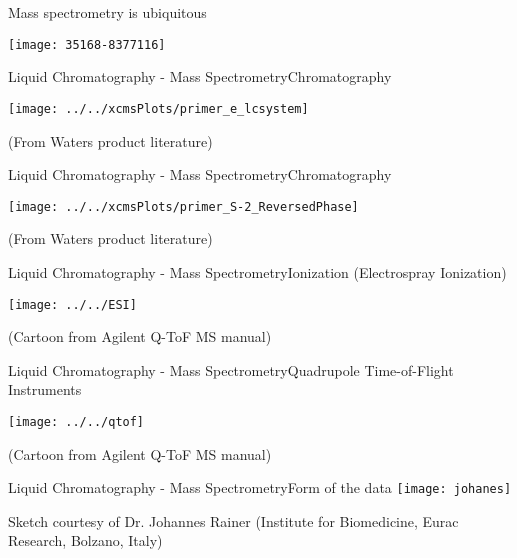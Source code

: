 \documentclass[xcolor=dvipsnames]{beamer}
\begin{document}
\begin{frame}{Mass spectrometry is ubiquitous}
	\vspace{-15pt}
\begin{center}
	\texttt{[image: 35168-8377116]}
\end{center}
\end{frame}

\begin{frame}{Liquid Chromatography - Mass Spectrometry}{Chromatography}
\begin{center}
	\texttt{[image: ../../xcmsPlots/primer\_e\_lcsystem]}
	
	\tiny{(From Waters product literature)}
\end{center}
\end{frame}

\begin{frame}{Liquid Chromatography - Mass Spectrometry}{Chromatography}
\begin{center}
\texttt{[image: ../../xcmsPlots/primer\_S-2\_ReversedPhase]}
	
	\tiny{(From Waters product literature)}
\end{center}
\end{frame}

\begin{frame}{Liquid Chromatography - Mass Spectrometry}{Ionization (Electrospray Ionization)}
\vspace{-7pt}
\begin{center}
	\texttt{[image: ../../ESI]}
	
	\tiny{(Cartoon from Agilent Q-ToF MS manual)}
\end{center}
\end{frame}

\begin{frame}{Liquid Chromatography - Mass Spectrometry}{Quadrupole Time-of-Flight Instruments}
\vspace{-7pt}
\begin{center}
	\texttt{[image: ../../qtof]}
	
	\tiny{(Cartoon from Agilent Q-ToF MS manual)}
\end{center}
\end{frame}

\begin{frame}{Liquid Chromatography - Mass Spectrometry}{Form of the data}
\vspace{-7pt}
\texttt{[image: johanes]}

\tiny{Sketch courtesy of Dr. Johannes Rainer (Institute for Biomedicine, Eurac Research, Bolzano, Italy)}
\end{frame}
\end{document}
